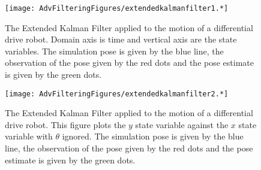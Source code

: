 \begin{Shaded}
\begin{Highlighting}[]

\OperatorTok{=}\NormalTok{ [}\OperatorTok{:}\OperatorTok{:}\OperatorTok{{-}}\OperatorTok{;}\NormalTok{]}
\OperatorTok{=}\OperatorTok{,}\OperatorTok{,}\OperatorTok{=}\NormalTok{(}\OperatorTok{,:}
\OperatorTok{!}\OperatorTok{,}\OperatorTok{,}\OperatorTok{,}\OperatorTok{=} \OperatorTok{:}
\OperatorTok{!}\OperatorTok{,}\OperatorTok{,}\OperatorTok{=} \OperatorTok{,}\OperatorTok{=} \OperatorTok{:}

\OperatorTok{=}\NormalTok{ plot(x[}\OperatorTok{:,}\NormalTok{]}\OperatorTok{,}\NormalTok{ x[}\OperatorTok{:,}\NormalTok{]}\OperatorTok{,}\OperatorTok{=}\NormalTok{(}\OperatorTok{,:}
\OperatorTok{!}\NormalTok{(xf[}\OperatorTok{:,}\NormalTok{]}\OperatorTok{,}\NormalTok{ xf[}\OperatorTok{:,}\NormalTok{]}\OperatorTok{,}\OperatorTok{=} \OperatorTok{,}\OperatorTok{=} \OperatorTok{:}
\OperatorTok{!}\NormalTok{(z[}\OperatorTok{:,}\NormalTok{]}\OperatorTok{,}\NormalTok{ z[}\OperatorTok{:,}\NormalTok{]}\OperatorTok{,}\OperatorTok{=} \OperatorTok{,}\OperatorTok{=} \OperatorTok{:}
\end{Highlighting}
\end{Shaded}

\begin{figure}
\centering
\texttt{[image: AdvFilteringFigures/extendedkalmanfilter1.*]}
\caption{The Extended Kalman Filter applied to the motion of a
differential drive robot. Domain axis is time and vertical axis are the
state variables. The simulation pose is given by the blue line, the
observation of the pose given by the red dots and the pose estimate is
given by the green dots.}
\end{figure}

\begin{figure}
\centering
\texttt{[image: AdvFilteringFigures/extendedkalmanfilter2.*]}
\caption{The Extended Kalman Filter applied to the motion of a
differential drive robot. This figure plots the \(y\) state variable
against the \(x\) state variable with \(\theta\) ignored. The simulation
pose is given by the blue line, the observation of the pose given by the
red dots and the pose estimate is given by the green dots.}
\end{figure}

